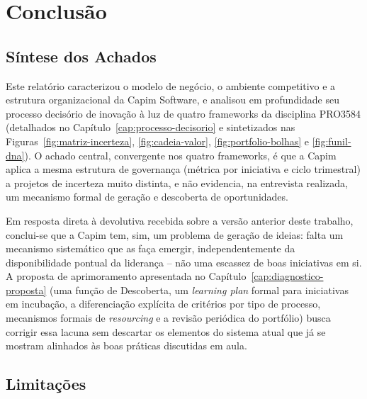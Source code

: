 
\chapter{Conclusão}
\label{cap:conclusao}

\section{Síntese dos Achados}

Este relatório caracterizou o modelo de negócio, o ambiente competitivo e a estrutura organizacional da Capim Software, e analisou em profundidade seu processo decisório de inovação à luz de quatro frameworks da disciplina PRO3584 (detalhados no Capítulo~\ref{cap:processo-decisorio} e sintetizados nas Figuras~\ref{fig:matriz-incerteza}, \ref{fig:cadeia-valor}, \ref{fig:portfolio-bolhas} e \ref{fig:funil-dna}). O achado central, convergente nos quatro frameworks, é que a Capim aplica a mesma estrutura de governança (métrica por iniciativa e ciclo trimestral) a projetos de incerteza muito distinta, e não evidencia, na entrevista realizada, um mecanismo formal de geração e descoberta de oportunidades.

Em resposta direta à devolutiva recebida sobre a versão anterior deste trabalho, conclui-se que a Capim tem, sim, um problema de geração de ideias: falta um mecanismo sistemático que as faça emergir, independentemente da disponibilidade pontual da liderança -- não uma escassez de boas iniciativas em si. A proposta de aprimoramento apresentada no Capítulo~\ref{cap:diagnostico-proposta} (uma função de Descoberta, um \textit{learning plan} formal para iniciativas em incubação, a diferenciação explícita de critérios por tipo de processo, mecanismos formais de \textit{resourcing} e a revisão periódica do portfólio) busca corrigir essa lacuna sem descartar os elementos do sistema atual que já se mostram alinhados às boas práticas discutidas em aula.

\section{Limitações}

